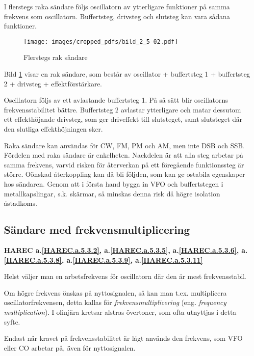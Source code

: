 I flerstegs raka sändare följs oscillatorn av ytterligare funktioner
på samma frekvens som oscillatorn.
Buffertsteg, drivsteg och slutsteg kan vara sådana funktioner.

\begin{figure}
  \texttt{[image: images/cropped\_pdfs/bild\_2\_5-02.pdf]}
  \caption{Flerstegs rak sändare}
  \label{fig:bildII5-2}
\end{figure}

Bild \ref{fig:bildII5-2} visar en rak sändare, som består av oscillator +
buffertsteg 1 + buffertsteg 2 + drivsteg + effektförstärkare.

Oscillatorn följs av ett avlastande buffertsteg 1.
På så sätt blir oscillatorns frekvensstabilitet bättre.
Buffertsteg 2 avlastar ytterligare och matar dessutom ett effekthöjande
drivsteg, som ger driveffekt till slutsteget, samt slutsteget där den slutliga
effekthöjningen sker.

Raka sändare kan användas för CW, FM, PM och AM, men inte DSB och SSB.
Fördelen med raka sändare är enkelheten.
Nackdelen är att alla steg arbetar på samma frekvens, varvid risken för
återverkan på ett föregående funktionssteg är större.
Oönskad återkoppling kan då bli följden, som kan ge ostabila egenskaper hos
sändaren.
Genom att i första hand bygga in VFO och buffertstegen i metallkapslingar,
s.k. skärmar, så minskas denna risk då högre isolation åstadkoms.

\subsection{Sändare med frekvensmultiplicering}
\textbf{HAREC
 a.\ref{HAREC.a.5.3.2}\label{myHAREC.a.5.3.2},
 a.\ref{HAREC.a.5.3.5}\label{myHAREC.a.5.3.5},
 a.\ref{HAREC.a.5.3.6}\label{myHAREC.a.5.3.6},
 a.\ref{HAREC.a.5.3.8}\label{myHAREC.a.5.3.8},
 a.\ref{HAREC.a.5.3.9}\label{myHAREC.a.5.3.9},
 a.\ref{HAREC.a.5.3.11}\label{myHAREC.a.5.3.11}
}

Helst väljer man en arbetsfrekvens för oscillatorn där den är mest
frekvensstabil.

Om högre frekvens önskas på nyttosignalen, så kan man
t.ex. multiplicera oscillatorfrekvensen, detta kallas för
\emph{frekvensmultiplicering} (eng. \emph{frequency multiplication}).
I olinjära kretsar alstras övertoner, som ofta utnyttjas i detta syfte.

Endast när kravet på frekvensstabilitet är lågt används den frekvens,
som VFO eller CO arbetar på, även för nyttosignalen.

